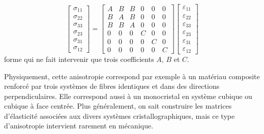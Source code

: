 \begin{equation}
    \begin{bmatrix}
        \sigma_{11}\\
        \sigma_{22}\\
        \sigma_{33}\\
        \sigma_{23}\\
        \sigma_{31}\\
        \sigma_{12}
    \end{bmatrix}
    =
    \begin{bmatrix}
        A & B & B & 0 & 0 & 0 \\
        B & A & B & 0 & 0 & 0 \\
        B & B & A & 0 & 0 & 0 \\
        0 & 0 & 0 & C & 0 & 0 \\
        0 & 0 & 0 & 0 & C & 0 \\
        0 & 0 & 0 & 0 & 0 & C
    \end{bmatrix}
    \begin{bmatrix}
        \varepsilon_{11}\\
        \varepsilon_{22}\\
        \varepsilon_{33}\\
        \varepsilon_{23}\\
        \varepsilon_{31}\\
        \varepsilon_{12}
    \end{bmatrix}
    \label{eq:Ch05-018}
\end{equation}
forme qui ne fait intervenir que trois coefficients $A$, $B$ et $C$. 

Physiquement, cette anisotropie correspond par exemple à un matériau composite renforcé par trois systèmes de fibres identiques et dans des directions perpendiculaires.
Elle correspond aussi à un monocristal en système cubique ou cubique à face centrée.
Plus généralement, on sait construire les matrices d'élasticité associées aux divers systèmes cristallographiques, mais ce type d'anisotropie intervient rarement en mécanique. 

